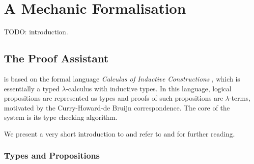 \chapter{A Mechanic Formalisation}\label{chap:implementation}

TODO: introduction.


\section{The \Coq Proof Assistant}

\Coq \citep{coq-refman-09} is based on the formal
language \emph{Calculus of Inductive Constructions}
\citep{coquand-huet-88,mohring-93}, which is essentially a typed
$\lambda$-calculus with inductive types. In this language, logical
propositions are represented as types and proofs of such propositions
are $\lambda$-terms, motivated by the Curry-Howard-de Bruijn
correspondence. The core of the \Coq system is its type checking
algorithm.

We present a very short introduction to \Coq and refer to
\citet{bertot-casteran-04} and \citet{chlipala-09} for further
reading.


\subsection{Types and Propositions}

